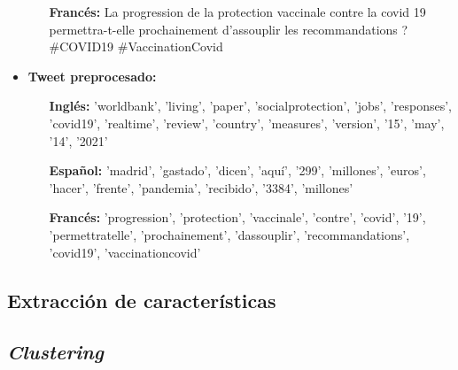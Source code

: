 \begin{itemize}
\begin{itemize}
        \item [\textbf{Francés:}] La progression de la protection vaccinale contre la covid 19 permettra-t-elle prochainement d'assouplir les recommandations ? \#COVID19 \#VaccinationCovid 
    \end{itemize}
    \item \textbf{Tweet preprocesado:}\\ 
    \begin{itemize}
        \item [\textbf{Inglés:}] 'worldbank', 'living', 'paper', 'socialprotection', 'jobs', 'responses', 'covid19', 'realtime', 'review', 'country', 'measures', 'version', '15', 'may', '14', '2021'
        \item [\textbf{Español:}] 'madrid', 'gastado', 'dicen', 'aquí', '299', 'millones', 'euros', 'hacer', 'frente', 'pandemia', 'recibido', '3384', 'millones'
        \item [\textbf{Francés:}] 'progression', 'protection', 'vaccinale', 'contre', 'covid', '19', 'permettratelle', 'prochainement', 'dassouplir', 'recommandations', 'covid19', 'vaccinationcovid'
    \end{itemize}
\end{itemize}


\subsection{Extracción de características}
\subsection{\textit{Clustering}}
